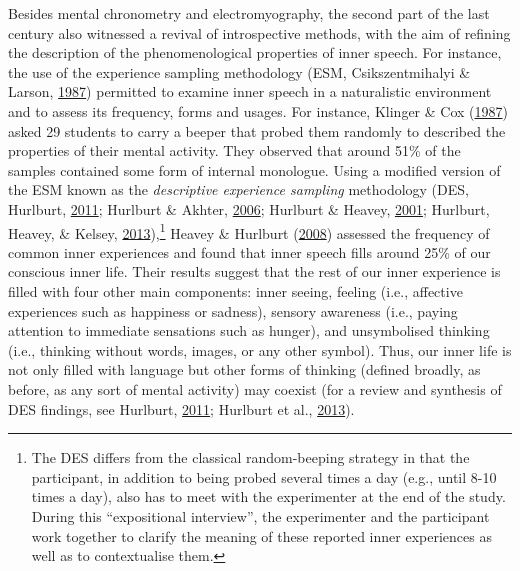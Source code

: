\documentclass[a4paper,12pt,twoside,onecolumn,openright,final,oldfontcommands]{memoir}
\let\rmarkdownfootnote\footnote%
\def\footnote{\protect\rmarkdownfootnote}
\begin{document}
Besides mental chronometry and electromyography, the second part of the last century also witnessed a revival of introspective methods, with the aim of refining the description of the phenomenological properties of inner speech. For instance, the use of the experience sampling methodology (ESM, Csikszentmihalyi \& Larson, \protect\hyperlink{ref-csikszentmihalyi_validity_1987}{1987}) permitted to examine inner speech in a naturalistic environment and to assess its frequency, forms and usages. For instance, Klinger \& Cox (\protect\hyperlink{ref-klinger_dimensions_1987}{1987}) asked 29 students to carry a beeper that probed them randomly to described the properties of their mental activity. They observed that around 51\% of the samples contained some form of internal monologue. Using a modified version of the ESM known as the \emph{descriptive experience sampling} methodology (DES, Hurlburt, \protect\hyperlink{ref-Hurlburt2011}{2011}; Hurlburt \& Akhter, \protect\hyperlink{ref-hurlburt_descriptive_2006}{2006}; Hurlburt \& Heavey, \protect\hyperlink{ref-Hurlburt2001}{2001}; Hurlburt, Heavey, \& Kelsey, \protect\hyperlink{ref-Hurlburt2013}{2013}),\footnote{The DES differs from the classical random-beeping strategy in that the participant, in addition to being probed several times a day (e.g., until 8-10 times a day), also has to meet with the experimenter at the end of the study. During this \enquote{expositional interview}, the experimenter and the participant work together to clarify the meaning of these reported inner experiences as well as to contextualise them.} Heavey \& Hurlburt (\protect\hyperlink{ref-heavey_phenomena_2008}{2008}) assessed the frequency of common inner experiences and found that inner speech fills around 25\% of our conscious inner life. Their results suggest that the rest of our inner experience is filled with four other main components: inner seeing, feeling (i.e., affective experiences such as happiness or sadness), sensory awareness (i.e., paying attention to immediate sensations such as hunger), and unsymbolised thinking (i.e., thinking without words, images, or any other symbol). Thus, our inner life is not only filled with language but other forms of thinking (defined broadly, as before, as any sort of mental activity) may coexist (for a review and synthesis of DES findings, see Hurlburt, \protect\hyperlink{ref-Hurlburt2011}{2011}; Hurlburt et al., \protect\hyperlink{ref-Hurlburt2013}{2013}).
\end{document}
